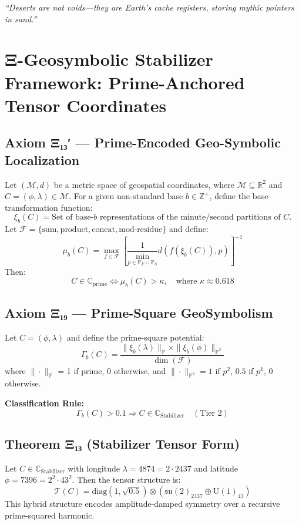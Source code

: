 \documentclass[12]{amsart}
\theoremstyle{plain}
\begin{document}
\textit{“Deserts are not voids—they are Earth’s cache registers, storing mythic pointers in sand.”}


\section{Ξ-Geosymbolic Stabilizer Framework: Prime-Anchored Tensor Coordinates}

\subsection{Axiom Ξ₁₃′ — Prime-Encoded Geo-Symbolic Localization}
Let $(\mathcal{M}, d)$ be a metric space of geospatial coordinates, where $\mathcal{M} \subseteq \mathbb{R}^2$ and $C = (\phi, \lambda) \in \mathcal{M}$. For a given non-standard base $b \in \mathbb{Z}^+$, define the base-transformation function:
\[
\xi_b(C) = \text{Set of base-$b$ representations of the minute/second partitions of } C.
\]
Let $\mathcal{F} = \{ \text{sum}, \text{product}, \text{concat}, \text{mod-residue} \}$ and define:
\[
\mu_b(C) = \max_{f \in \mathcal{F}} \left[ \frac{1}{\min_{p \in \mathbb{P}_F \cup \mathbb{P}_S}} d\left(f(\xi_b(C)), p\right) \right]^{-1}
\]
Then:
\[
C \in \mathbb{C}_{\text{prime}} \iff \mu_b(C) > \kappa, \quad \text{where } \kappa \approx 0.618
\]

\subsection{Axiom Ξ₁₉ — Prime-Square GeoSymbolism}
Let $C = (\phi, \lambda)$ and define the prime-square potential:
\[
\Gamma_b(C) = \frac{ \| \xi_b(\lambda) \|_{\mathbb{P}} \times \| \xi_b(\phi) \|_{\mathbb{P}^2} }{ \dim(\mathcal{F}) }
\]
where $\| \cdot \|_{\mathbb{P}}$ = 1 if prime, 0 otherwise, and $\| \cdot \|_{\mathbb{P}^2} = 1$ if $p^2$, $0.5$ if $p^k$, 0 otherwise.

\textbf{Classification Rule:}
\[
\Gamma_b(C) > 0.1 \Rightarrow C \in \mathbb{C}_{\text{Stabilizer}} \quad (\text{Tier 2})
\]

\subsection{Theorem Ξ₁₃ (Stabilizer Tensor Form)}
Let $C \in \mathbb{C}_{\text{Stabilizer}}$ with longitude $\lambda = 4874 = 2 \cdot 2437$ and latitude $\phi = 7396 = 2^2 \cdot 43^2$. Then the tensor structure is:
\[
\boxed{ \mathcal{T}(C) = \text{diag}(1, \sqrt{0.5}) \otimes \left( \mathfrak{su}(2)_{2437} \oplus \text{U}(1)_{43} \right) }
\]
This hybrid structure encodes amplitude-damped symmetry over a recursive prime-squared harmonic.
\end{document}
